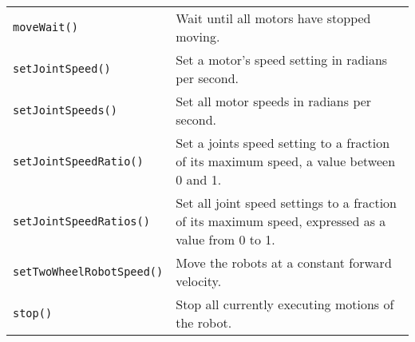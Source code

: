 \begin{tabular}{p{1.75in}p{4.5in}}
\texttt{moveWait()} & Wait until all motors have stopped moving. \\
\texttt{setJointSpeed()} & Set a motor's speed setting in radians per second. \\
\texttt{setJointSpeeds()} & Set all motor speeds in radians per second. \\
\texttt{setJointSpeedRatio()} & Set a joints speed setting to a fraction of its maximum speed, a value between 0 and 1. \\
\texttt{setJointSpeedRatios()} & Set all joint speed settings to a fraction of its
maximum speed, expressed as a value from 0 to 1. \\
\texttt{setTwoWheelRobotSpeed()} & Move the robots at a constant forward velocity. \\
\texttt{stop()} & Stop all currently executing motions of the robot. \\
\hline
\end{tabular}

